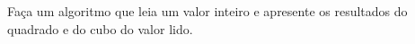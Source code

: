 
\question[10]

Faça um algoritmo que leia um valor inteiro e apresente os resultados do quadrado e do cubo do valor lido.

